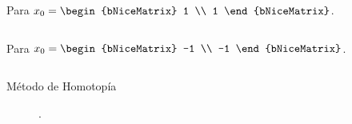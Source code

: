 \begin{frame}[fragile]
	Para
	\begin{math}
		x_{0}=
		\begin{bNiceMatrix}
			1 \\
			1
		\end{bNiceMatrix}
	\end{math}.
	\begin{center}
		\begin{minipage}{0.5\textwidth}
			\inputminted[fontsize=\tiny,firstline=1,lastline=17]{text}{resultado_pregunta_2.txt}
		\end{minipage}
	\end{center}

	Para
	\begin{math}
		x_{0}=
		\begin{bNiceMatrix}
			-1 \\
			-1
		\end{bNiceMatrix}
	\end{math}.
	\begin{center}
		\begin{minipage}{0.5\textwidth}
			\inputminted[fontsize=\tiny,firstline=18,lastline=35]{text}{resultado_pregunta_2.txt}
		\end{minipage}
	\end{center}
\end{frame}

\begin{frame}
	\begin{solution}
		\begin{description}
			\item[Método de Homotopía]

				.
		\end{description}
	\end{solution}
\end{frame}